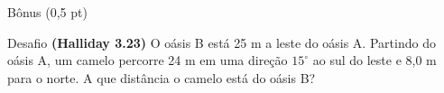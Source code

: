 \documentclass[xcolor=dvipsnames,table]{beamer}
\begin{document}
	\begin{frame}{Bônus (0,5 pt)}
		\begin{block}{Desafio}
			{\bf (Halliday 3.23)} O oásis B está 25 m a leste do oásis A. Partindo do oásis A, um camelo percorre 24 m em uma direção $15^{\circ}$ ao sul do leste e 8,0 m para o norte. A que distância o camelo está do oásis B?
		\end{block}
	\end{frame}
	
	\begin{frame}
		\titlepage
	\end{frame}
	
\end{document}
